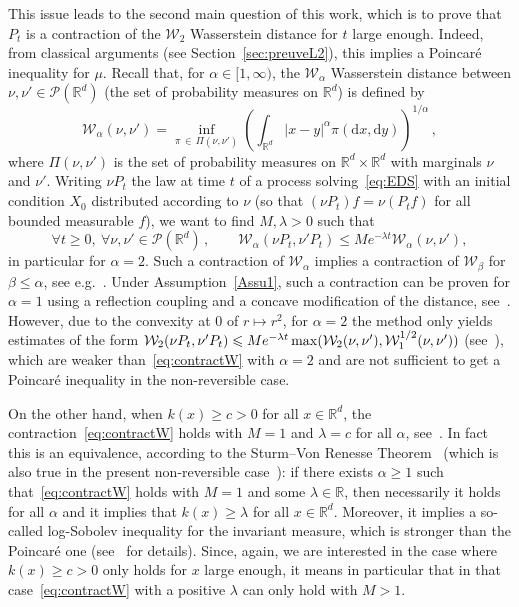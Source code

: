 \documentclass[AHL,Unicode,longabstracts,published]{cedram}
\newcommand{\R}{\mathbb R}
\newcommand{\clP}{\mathcal P}
\newcommand{\clW}{\mathcal W}
\newcommand{\dd}{\mathrm{d}}
\newcommand{\1}{\mathbbm{1}}
\newcommand{\nv}[1]{#1}
\let\oldforall\forall
\renewcommand*{\forall}{\mathrel{\oldforall}}
\newcommand{\R}{\mathbb R}
\newcommand{\clW}{\mathcal W}
\begin{document}
This issue leads to the second main question of this work, which is to prove that $P_t$ is a contraction of the $\clW_2$ Wasserstein distance for $t$ large enough. Indeed, from classical arguments (see Section~\ref{sec:preuveL2}), this implies a Poincaré inequality for $\mu$. Recall that, for $\alpha\in[1,\infty)$, the $\clW_\alpha$ Wasserstein distance between $\nu,\nu'\in\clP(\R^d)$ (the set of probability measures on $\R^d$) is defined by
\[
\clW_\alpha(\nu,\nu') = \inf_{\pi\,\in\,\Pi(\nu,\nu')} \left( \int_{\R^d} |x-y|^\alpha \pi(\dd x,\dd y)\right)^{1/\alpha}\,,
\]
where $\Pi(\nu,\nu')$ is the set of probability measures on $\R^d\times\R^d$ with marginals $\nu$ and $\nu'$. Writing $\nu P_t$ the law at time $t$ of a process solving~\eqref{eq:EDS} with an initial condition $X_0$ distributed according to $\nu$ (so that $(\nu P_t) f = \nu(P_t f)$ for all bounded measurable $f$), we want to find $M,\lambda>0$ such that
\begin{equation}\label{eq:contractW}
\forall t\geqslant 0,\ \forall \nu,\nu'\in\clP(\R^d)\,,\qquad
\clW_\alpha(\nu P_t,\nu' P_t) \leqslant M e^{-\lambda t} \clW_\alpha(\nu,\nu'),
\end{equation}
in particular for $\alpha=2$. Such a contraction of $\clW_\alpha$ implies a contraction of $\clW_{\beta}$ for \linebreak$\beta\leqslant \alpha$, see e.g.~\cite{MonmarcheContraction}. Under Assumption~\ref{Assu1}, such a contraction can be proven for $\alpha=1$ using a reflection coupling and a concave modification of the distance, see~\cite{Eberle2,Eberle1}. However, due to the convexity at $0$ of $r\mapsto r^2$, for $\alpha=2$ the method only yields estimates of the form $\clW_2(\nu P_t,\nu' P_t) \leqslant M e^{-\lambda t} \max(\clW_{2}(\nu,\nu'),\linebreak \clW_1^{1/2}(\nu,\nu'))$ (see~\cite{JWang2,JWang1}), which are weaker than~\eqref{eq:contractW} with $\alpha=2$ and are not sufficient to get a Poincaré inequality in the non-reversible case.

On the other hand, when $k(x) \geqslant c >0$ for all $x\in\R^d$, the contraction~\eqref{eq:contractW} holds with $M=1$ and $\lambda=c$ for all $\alpha$, see~\cite{MonmarcheContraction}. In fact this is an equivalence\nv{, according to the Sturm--Von Renesse Theorem~\cite{VonRenesseSturm} (which is also true in the present non-reversible case~\cite{MonmarcheContraction}):} if there exists $\alpha\geqslant 1$ such that~\eqref{eq:contractW} holds with $M=1$ and some $\lambda\in\R$, then necessarily it holds for all $\alpha$ and it implies that $k(x) \geqslant \lambda$ for all $x\in\R^d$. \nv{Moreover, it implies a so-called log-Sobolev inequality for the invariant measure, which is stronger than the Poincaré one (see~\cite{MonmarcheContraction} for details)}. \nv{Since,} again, we are interested in the case where $k(x)\geqslant c>0$ only holds for $x$ large enough, it means in particular that in that case~\eqref{eq:contractW} with a positive $\lambda$ can only hold with $M>1$.
\end{document}
